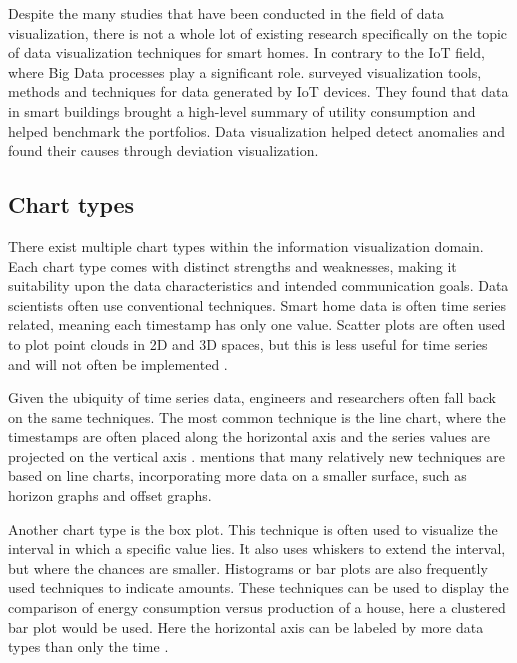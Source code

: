 \documentclass[journal]{IEEEtran}
\begin{document}
Despite the many studies that have been conducted in the field of data visualization, there is not a whole lot of existing research specifically on the topic of data visualization techniques for smart homes. In contrary to the IoT field, where Big Data processes play a significant role. \cite{Protopsaltis2020DataChallenges} surveyed visualization tools, methods and techniques for data generated by IoT devices. They found that data in smart buildings brought a high-level summary of utility consumption and helped benchmark the portfolios. Data visualization helped detect anomalies and found their causes through deviation visualization. 

\subsection{Chart types}
There exist multiple chart types within the information visualization domain. Each chart type comes with distinct strengths and weaknesses, making it suitability upon the data characteristics and intended communication goals. Data scientists often use conventional techniques. Smart home data is often time series related, meaning each timestamp has only one value. Scatter plots are often used to plot point clouds in 2D and 3D spaces, but this is less useful for time series and will not often be implemented \cite{Protopsaltis2020DataChallenges}.

Given the ubiquity of time series data, engineers and researchers often fall back on the same techniques. The most common technique is the line chart, where the timestamps are often placed along the horizontal axis and the series values are projected on the vertical axis \cite{Heer2009SizingVisualizations}. \cite{Heer2009SizingVisualizations} mentions that many relatively new techniques are based on line charts, incorporating more data on a smaller surface, such as horizon graphs and offset graphs. 

Another chart type is the box plot. This technique is often used to visualize the interval in which a specific value lies. It also uses whiskers to extend the interval, but where the chances are smaller. Histograms or bar plots are also frequently used techniques to indicate amounts. These techniques can be used to display the comparison of energy consumption versus production of a house, here a clustered bar plot would be used. Here the horizontal axis can be labeled by more data types than only the time \cite{Heer2009SizingVisualizations, Midway2020PrinciplesVisualization, TeamBytebeam2023UnleashingRevealed}. 
\end{document}
